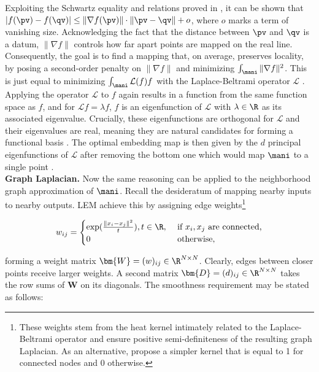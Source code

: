 Exploiting the Schwartz equality and relations proved in 
\citet{belkinniyogi2008}, it
can be shown that 
$|f(\pv) - f(\qv)| \leq \| \nabla f(\pv) \| \cdot \| \pv - \qv\| + o$, where 
$o$ marks a term of vanishing size. 
Acknowledging the fact that the distance between $\pv$ and $\qv$ is a datum,
$\| \nabla f \|$ controls how far apart points are mapped on the real line.
Consequently, the goal is to find a mapping that, on average, preserves 
locality, by posing a second-order penalty on $\| \nabla f \|$ and minimizing $\int_{\mani}\| \nabla f \|^2$.
This is just equal to minimizing $\int_{\mani} \mathcal{L}(f)f$ with the 
Laplace-Beltrami operator $\mathcal{L}$ \citep{belkinniyogi2003}.
Applying the operator $\mathcal{L}$ to $f$ again results in a function from the 
same function space as $f$, and for $\mathcal{L} f = \lambda f$, $f$ is an 
eigenfunction of $\mathcal{L}$ with $\lambda \in \R$ as its associated 
eigenvalue.
Crucially, these eigenfunctions are orthogonal for $\mathcal{L}$ and their  
eigenvalues are real, meaning they are natural candidates for forming a 
functional basis \citep{levy2006}.
The optimal embedding map is then given by the $d$ principal eigenfunctions of
$\mathcal{L}$ after removing the bottom one which would map $\mani$ to a 
single point \citep{belkinniyogi2003}.
\\

\textbf{Graph Laplacian.}
Now the same reasoning can be applied to the neighborhood graph approximation of
$\mani$.
Recall the desideratum of mapping nearby inputs to nearby 
outputs.
LEM achieve this by assigning edge weights\footnote{
These weights stem from the heat kernel intimately related to the 
Laplace-Beltrami operator and ensure positive semi-definiteness of the resulting
graph Laplacian. 
As an alternative, \citet{belkinniyogi2003} propose a simpler kernel that is 
equal to 1 for connected nodes and 0 otherwise.
}

\begin{equation*}
  w_{ij} = \begin{cases}
    \exp(\frac{\|x_i - x_j \|^2}{t}), t \in \R, & \mbox{ if } x_i, x_j  
    \text{ are connected,} \\
    0 & \mbox{ otherwise,}
  \end{cases}
\end{equation*}

forming a weight matrix $\bm{W} = (w)_{ij} \in \R^{N \times N}$.
Clearly, edges between closer points receive larger weights.
A second matrix $\bm{D} = (d)_{ij} \in \R^{N \times N}$ takes the row sums of
$\bm{W}$ on its diagonals.
The smoothness requirement may be stated as follows:

